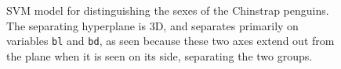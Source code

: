 \documentclass[
  letterpaper,
]{krantz}
\begin{document}
\begin{figure}

\begin{minipage}[t]{0.50\linewidth}

{\centering 


}

\end{minipage}%
%
\begin{minipage}[t]{0.50\linewidth}

{\centering 


}

\end{minipage}%

\caption{\label{fig-p-svm-pdf}SVM model for distinguishing the sexes of
the Chinstrap penguins. The separating hyperplane is 3D, and separates
primarily on variables \texttt{bl} and \texttt{bd}, as seen because
these two axes extend out from the plane when it is seen on its side,
separating the two groups.}

\end{figure}
\end{document}
